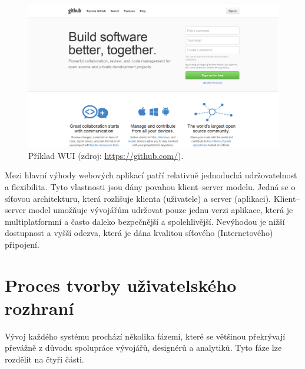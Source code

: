 \begin{figure}[htbp]
    \centering
    \includegraphics[width=\textwidth]{images/wui-example.png}
    \caption{Příklad WUI (zdroj: \url{https://github.com/}).}
\end{figure}

Mezi hlavní výhody webových aplikací patří relativně jednoduchá udržovatelnost a flexibilita. Tyto vlastnosti jsou dány povahou klient--server modelu. Jedná se o síťovou architekturu, která rozlišuje klienta (uživatele) a server (aplikaci). Klient--server model umožňuje vývojářům udržovat pouze jednu verzi aplikace, která je multiplatformní a často daleko bezpečnější a spolehlivější. Nevýhodou je nižší dostupnost a vyšší odezva, která je dána kvalitou síťového (Internetového) připojení.

\section{Proces tvorby uživatelského rozhraní}
\label{sec:process}

\begin{quote}
\end{quote}

\noindent
Vývoj každého systému prochází několika fázemi, které se většinou překrývají převážně z důvodu spolupráce vývojářů, designérů a analytiků. Tyto fáze lze rozdělit na čtyři části.

